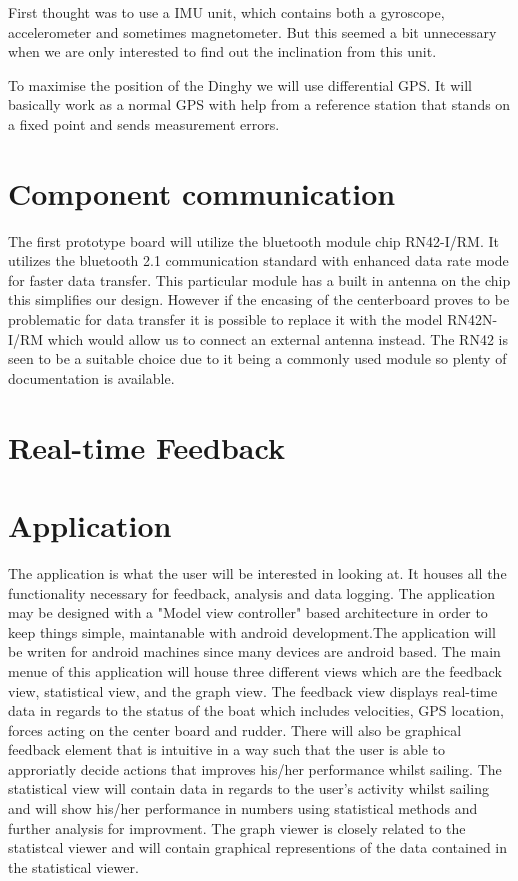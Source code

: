 ﻿\documentclass{article}
\begin{document}
First thought was to use a IMU unit, which contains both a gyroscope, accelerometer and sometimes magnetometer. But this seemed a bit unnecessary when we are only interested to find out the inclination from this unit. 

To maximise the position of the Dinghy we will use differential GPS. It will basically work as a normal GPS with help from a reference station that stands on a fixed point and sends measurement errors.

\section{Component communication}
The first prototype board will utilize the bluetooth module chip RN42-I/RM.
It utilizes the bluetooth 2.1 communication standard with enhanced data rate mode
for faster data transfer. This particular module has a built in antenna on the chip
this simplifies our design. However if the encasing of the centerboard proves to be
problematic for data transfer it is possible to replace it with the model RN42N-I/RM
which would allow us to connect an external antenna instead. The RN42 is seen to be a suitable
choice due to it being a commonly used module so plenty of documentation is available.

\section{Real-time Feedback}

\section{Application}
The application is what the user will be interested in looking at. It houses all the functionality necessary for feedback, analysis and data logging. The application may be designed with a "Model view controller" based architecture in order to keep things simple, maintanable with android development.The application will be writen for android machines since many devices are android based.
The main menue of this application will house three different views which are the feedback view, statistical view, and the graph view.
The feedback view displays real-time data in regards to the status of the boat which includes velocities, GPS location, forces acting on the center board and rudder. There will also be graphical feedback element that is intuitive in a way such that the user is able to approriatly decide actions that improves his/her performance whilst sailing.
The statistical view will contain data in regards to the user's activity whilst sailing and will show his/her performance in numbers using statistical methods and further analysis for improvment. The graph viewer is closely related to the statistcal viewer and will contain graphical representions of the data contained in the statistical viewer.
\end{document}
